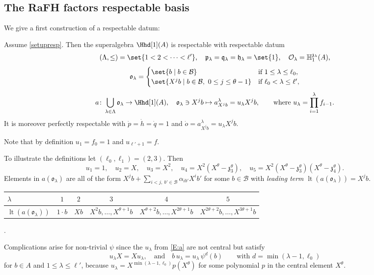\documentclass[a4paper,11pt]{amsart}
\newcommand{\lt}{\op{lt}}
\newcommand\cB{\mathcal{B}}
\numberwithin{equation}{subsection}
\theoremstyle{definition}
\theoremstyle{theorem}
\theoremstyle{remark}
\newcommand\CO{\mathcal{O}}
\newcommand\kapp{{\mathfrak{z}}}
\newcommand\plam[1][\lambda]{\mathfrak{p}_{#1}}
\newcommand\hlam[1][\lambda]{\mathfrak{h}_{#1}}
\newcommand\qlam[1][\lambda]{\mathfrak{q}_{#1}}
\newcommand\Olam[1][\lambda]{\CO_{#1}}
\newcommand\olam[1][\lambda]{\mathfrak{o}_{#1}}
\newcommand\HH{\mathbb{H}}
\newcommand\op{\operatorname}
\begin{document}
\subsection{The RaFH factors respectable basis} We give a first construction of a respectable datum:
\begin{Theorem}\label{T:1}
Assume \autoref{setupresp}.  Then the  superalgebra $\Hhd[1](A)$ is respectable with respectable datum
 \[(\Lambda,\le)=\set{1<2<\dots<\ell'},\quad\plam=\qlam=\hlam=\set{1},\quad\Olam=\HH^{\kapp_\lambda}_1(A),\]
       \[ \olam=\begin{cases}
          \set{b\mid b\in\cB} & \text{if }1\le\lambda\le\ell_0,\\
          \set{X^{j}b\mid b\in\cB,\ 0\le j\le\theta-1} & \text{if }\ell_0<\lambda\le\ell',
        \end{cases}
\]
\begin{equation}\label{E:a}
 a\colon\bigcup_{\lambda\in\Lambda}\olam\to\Hhd[1](A),\quad
        \olam\ni X^{j}b\mapsto a^{\lambda}_{X^{j}b}=u_\lambda X^{j}b,      \qquad\text{where }u_\lambda=\prod_{i=1}^{\lambda}f_{i-1}.
\end{equation}
It is moreover perfectly respectable with $\dot p=\dot h=\dot q=1$ and $\dot o=a^{\lambda}_{X^{j}b}=u_\lambda X^{j}b$.
\end{Theorem}

\begin{Remark}\label{uextrem}
  Note that by definition $u_1=f_0=1$ and $u_{\ell'+1}=f$.
\end{Remark}
\begin{Remark}
To illustrate the definitions let  $(\ell_0,\ell_1)=(2,3)$.  Then
  \[
    u_1=1,\quad u_2=X,\quad u_3=X^{2},\quad
    u_4=X^{2}(X^{\theta}-\kapp_3^{\theta}),\quad
    u_5=X^{2}(X^{\theta}-\kapp_3^{\theta})(X^{\theta}-\kapp_4^{\theta}).
  \]
  Elements in $a(\olam)$ are all of the form
  $X^{j}b+\sum_{i<j,\ b'\in\cB}\alpha_{ib'}X^{i}b'$ for some $b\in\cB$ with  \emph{leading term}  $\lt(a(\olam))=X^{j}b$.
  \begin{center}
    \begin{tabular}{l|c|c|c|c|c}
      $\lambda$ & $1$ & $2$ & $3$ & $4$ & $5$\\\hline
      $\lt(a(\olam))$ & $1\cdot b$ & $Xb$ & $X^{2}b,\dots,X^{\theta+1}b$
        & $X^{\theta+2}b,\dots,X^{2\theta+1}b$ & $X^{2\theta+2}b,\dots,X^{3\theta+1}b$
    \end{tabular}\;.
  \end{center}
  \end{Remark}
  \begin{Remark}Complications arise for non-trivial $\psi$ since the  $u_\lambda$ from \autoref{E:a} are not central but satisfy
 \begin{equation}\label{E:orbitpoly}
   u_\lambda X=Xu_\lambda, \quad\text{and}\quad b\,u_\lambda=u_\lambda\,\psi^{d}(b)\qquad\text{with }d=\min(\lambda-1,\ell_0)
\end{equation}
for $b\in A$ and $1\le\lambda\le\ell'$, because $u_\lambda=X^{\min(\lambda-1,\ell_0)}p(X^{\theta})$ for some polynomial $p$ in the central element
$X^{\theta}$.
  \end{Remark}
\end{document}
